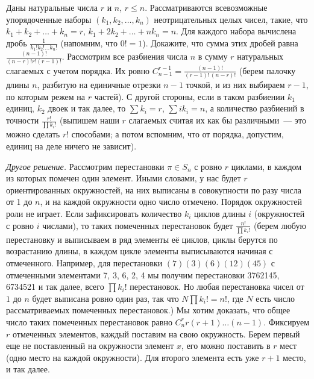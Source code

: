 \problem
Даны натуральные числа $r$ и $n$, $r \leq n$.
Рассматриваются всевозможные упорядоченные наборы $(k_1, k_2, \ldots, k_n)$
неотрицательных целых чисел, такие, что
$k_1 + k_2 + \ldots + k_n = r$, $k_1 + 2 k_2 + \ldots + n k_n = n$.
Для каждого набора вычислена дробь $\frac{1}{k_1! k_2! \ldots k_n!}$
(напомним, что $0! = 1$).
Докажите, что сумма этих дробей равна
\(
    \frac{(n - 1)!}{(n - r)! r! (r - 1)!}
\).
\solution
Рассмотрим все разбиения числа $n$ в сумму $r$ натуральных слагаемых с учетом
порядка.
Их ровно
$C_{n - 1}^{r - 1} = \frac{(n - 1)!}{(r - 1)! \, (n - r)!}$
(берем палочку длины $n$, разбитую на единичные отрезки $n - 1$ точкой, и из
них выбираем $r - 1$, по которым режем на $r$ частей).
С другой стороны, если в таком разбиении $k_1$ единиц, $k_2$ двоек и так далее,
то $\sum k_i = r$, $\sum i k_i = n$, а количество разбиений в точности
$\frac{r!}{\prod k_i!}$
(выпишем наши $r$ слагаемых считая их как бы различными~--- это можно сделать
$r!$ способами;
а потом вспомним, что от порядка, допустим, единиц на деле ничего не зависит).
\par
\emph{Другое решение.}
Рассмотрим перестановки $\pi \in S_n$ с ровно $r$ циклами, в каждом из которых
помечен один элемент.
Иными словами, у нас будет $r$ ориентированных окружностей, на них выписаны в
совокупности по разу числа от 1 до $n$, и на каждой окружности одно число
отмечено.
Порядок окружностей роли не играет.
Если зафиксировать количество $k_i$ циклов длины $i$
(окружностей с ровно $i$ числами), то таких помеченных перестановок будет
$\frac{n!}{\prod k_i!}$
(берем любую перестановку и выписываем в ряд элементы её циклов, циклы берутся
по возрастанию длины, в каждом цикле элементы выписываются начиная с
отмеченного.
Например, для перестановки $(7) (3) (6) (1 2) (4 5)$ с отмеченными элементами
7, 3, 6, 2, 4 мы получим перестановки 3762145, 6734521 и так далее, всего
$\prod k_i!$ перестановок.
Но любая перестановка чисел от $1$ до $n$ будет выписана ровно один раз, так
что $N \prod k_i! = n!$, где $N$ есть число рассматриваемых помеченных
перестановок.)
Мы хотим доказать, что общее число таких помеченных перестановок равно
$C_n^{r} r (r + 1) \ldots (n - 1)$.
Фиксируем $r$ отмеченных элементов, каждый поставим на свою окружность.
Берем первый еще не поставленный на окружности элемент $x$, его можно поставить
в $r$ мест (одно место на каждой окружности).
Для второго элемента есть уже $r + 1$ место, и так далее.
\endproblem

